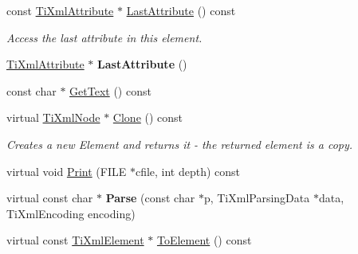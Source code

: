 \begin{DoxyCompactItemize}
\item 
\hypertarget{class_ti_xml_element_a86191b49f9177be132b85b14655f1381}{
const \hyperlink{class_ti_xml_attribute}{TiXmlAttribute} $\ast$ \hyperlink{class_ti_xml_element_a86191b49f9177be132b85b14655f1381}{LastAttribute} () const }
\label{class_ti_xml_element_a86191b49f9177be132b85b14655f1381}

\begin{DoxyCompactList}\small\item\em Access the last attribute in this element. \item\end{DoxyCompactList}\item 
\hypertarget{class_ti_xml_element_a222f81cf06155cd108f2a68d4d176004}{
\hyperlink{class_ti_xml_attribute}{TiXmlAttribute} $\ast$ {\bfseries LastAttribute} ()}
\label{class_ti_xml_element_a222f81cf06155cd108f2a68d4d176004}

\item 
const char $\ast$ \hyperlink{class_ti_xml_element_af3282294986cdb216646ea1f67af2c87}{GetText} () const 
\item 
\hypertarget{class_ti_xml_element_aa464535ea1994db337cb6a8ce4b588b5}{
virtual \hyperlink{class_ti_xml_node}{TiXmlNode} $\ast$ \hyperlink{class_ti_xml_element_aa464535ea1994db337cb6a8ce4b588b5}{Clone} () const }
\label{class_ti_xml_element_aa464535ea1994db337cb6a8ce4b588b5}

\begin{DoxyCompactList}\small\item\em Creates a new Element and returns it -\/ the returned element is a copy. \item\end{DoxyCompactList}\item 
virtual void \hyperlink{class_ti_xml_element_afbf52736e70fc91ec9d760721d6f4fd2}{Print} (FILE $\ast$cfile, int depth) const 
\item 
\hypertarget{class_ti_xml_element_a697f51bbfff55b7e371c20278087c223}{
virtual const char $\ast$ {\bfseries Parse} (const char $\ast$p, TiXmlParsingData $\ast$data, TiXmlEncoding encoding)}
\label{class_ti_xml_element_a697f51bbfff55b7e371c20278087c223}

\item 
\hypertarget{class_ti_xml_element_ac5b8d0e25fa23fd9acbb6d146082901c}{
virtual const \hyperlink{class_ti_xml_element}{TiXmlElement} $\ast$ \hyperlink{class_ti_xml_element_ac5b8d0e25fa23fd9acbb6d146082901c}{ToElement} () const }
\label{class_ti_xml_element_ac5b8d0e25fa23fd9acbb6d146082901c}


\end{DoxyCompactItemize}
